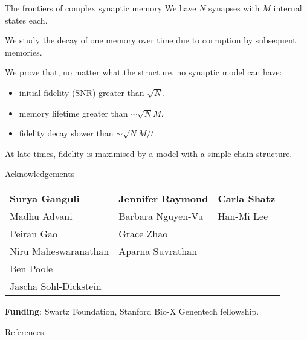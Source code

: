 \documentclass{beamer}%
\begin{document}

\begin{frame}{The frontiers of complex synaptic memory}
%
 We have $N$ synapses with $M$ internal states each.

 \vp We study the decay of one memory over time due to corruption by subsequent memories.

 \vp We prove that, no matter what the structure, no synaptic model can have:\\
 \begin{itemize}
   \item initial fidelity (SNR) greater than $\sqrt{N}$.
   \item memory lifetime greater than $\sim\sqrt{N}M$.
   \item fidelity decay slower than $\sim\sqrt{N}M/t$.
 \end{itemize}

 \vp At late times, fidelity is maximised by a model with a simple chain structure.
%
\end{frame}


\begin{frame}{Acknowledgements}
%
 \begin{tabular}{lll}
   \textbf{Surya Ganguli} & \textbf{Jennifer Raymond} & \textbf{Carla Shatz} \\
   Madhu Advani & Barbara Nguyen-Vu & Han-Mi Lee \\
   Peiran Gao & Grace Zhao & \\
   Niru Maheswaranathan & Aparna Suvrathan \\
   Ben Poole \\
   Jascha Sohl-Dickstein
 \end{tabular}

 \vp\textbf{Funding}: Swartz Foundation, Stanford Bio-X Genentech fellowship.
%
\end{frame}


\begin{frame}[allowframebreaks]{References}
%

 {\small
 
 
 }
%
\end{frame}


\end{document}
